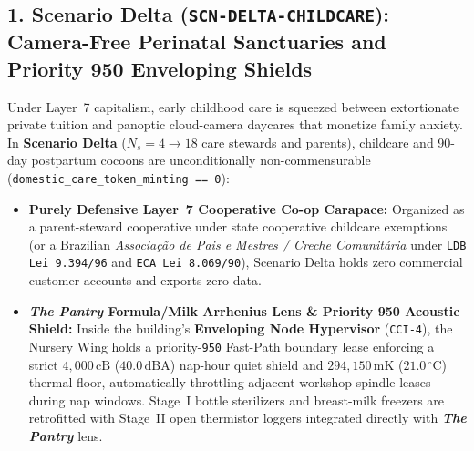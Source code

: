 \subsection{1. Scenario Delta (\texttt{SCN-DELTA-CHILDCARE}): Camera-Free Perinatal Sanctuaries and Priority 950 Enveloping Shields}
Under Layer~7 capitalism, early childhood care is squeezed between extortionate private tuition and panoptic cloud-camera daycares that monetize family anxiety. In \textbf{Scenario Delta} ($N_s = 4 \to 18$ care stewards and parents), childcare and 90-day postpartum cocoons are unconditionally non-commensurable (\texttt{domestic\_care\_token\_minting == 0}):
\begin{itemize}
    \item \textbf{Purely Defensive Layer~7 Cooperative Co-op Carapace:} Organized as a parent-steward cooperative under state cooperative childcare exemptions (or a Brazilian \textit{Associa{\c{c}}{\~a}o de Pais e Mestres / Creche Comunit{\'a}ria} under \texttt{LDB Lei 9.394/96} and \texttt{ECA Lei 8.069/90}), Scenario Delta holds zero commercial customer accounts and exports zero data.
    \item \textbf{\textit{The Pantry} Formula/Milk Arrhenius Lens \& Priority 950 Acoustic Shield:} Inside the building's \textbf{Enveloping Node Hypervisor} (\texttt{CCI-4}), the Nursery Wing holds a priority-\texttt{950} Fast-Path boundary lease enforcing a strict $4{,}000\,\mathrm{cB}$ ($40.0\,\mathrm{dBA}$) nap-hour quiet shield and $294{,}150\,\mathrm{mK}$ ($21.0\,^\circ\mathrm{C}$) thermal floor, automatically throttling adjacent workshop spindle leases during nap windows. Stage~I bottle sterilizers and breast-milk freezers are retrofitted with Stage~II open thermistor loggers integrated directly with \textbf{\textit{The Pantry}} lens.
\end{itemize}

